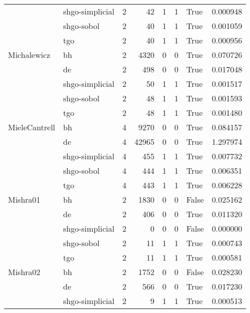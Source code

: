 \begin{longtable}{llrrrrlr}
         & shgo-simplicial &     2 &       42 &      1 &       1 &    True &    0.000948 \\
         & shgo-sobol &     2 &       40 &      1 &       1 &    True &    0.001059 \\
         & tgo &     2 &       40 &      1 &       1 &    True &    0.000956 \\
Michalewicz & bh &     2 &     4320 &      0 &       0 &    True &    0.070726 \\
         & de &     2 &      498 &      0 &       0 &    True &    0.017048 \\
         & shgo-simplicial &     2 &       50 &      1 &       1 &    True &    0.001517 \\
         & shgo-sobol &     2 &       48 &      1 &       1 &    True &    0.001593 \\
         & tgo &     2 &       48 &      1 &       1 &    True &    0.001480 \\
MieleCantrell & bh &     4 &     9270 &      0 &       0 &    True &    0.084157 \\
         & de &     4 &    42965 &      0 &       0 &    True &    1.297974 \\
         & shgo-simplicial &     4 &      455 &      1 &       1 &    True &    0.007732 \\
         & shgo-sobol &     4 &      444 &      1 &       1 &    True &    0.006351 \\
         & tgo &     4 &      443 &      1 &       1 &    True &    0.006228 \\
Mishra01 & bh &     2 &     1830 &      0 &       0 &   False &    0.025162 \\
         & de &     2 &      406 &      0 &       0 &    True &    0.011320 \\
         & shgo-simplicial &     2 &        0 &      0 &       0 &   False &    0.000000 \\
         & shgo-sobol &     2 &       11 &      1 &       1 &    True &    0.000743 \\
         & tgo &     2 &       11 &      1 &       1 &    True &    0.000581 \\
Mishra02 & bh &     2 &     1752 &      0 &       0 &   False &    0.028230 \\
         & de &     2 &      566 &      0 &       0 &    True &    0.017230 \\
         & shgo-simplicial &     2 &        9 &      1 &       1 &    True &    0.000513 \\

\end{longtable}
